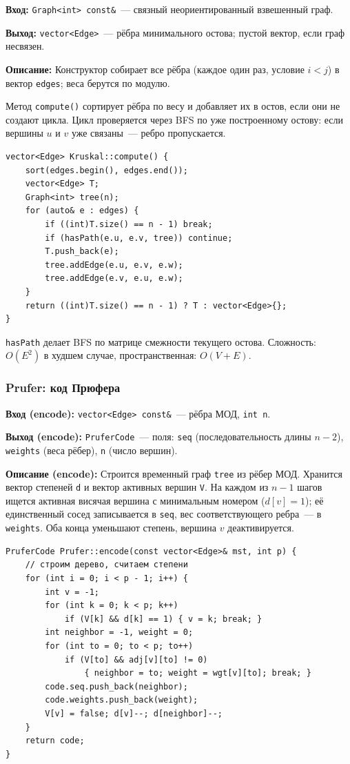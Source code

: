 \textbf{Вход:} \texttt{Graph<int> const\&}~--- связный неориентированный взвешенный граф.

\textbf{Выход:} \texttt{vector<Edge>}~--- рёбра минимального остова;
пустой вектор, если граф несвязен.

\textbf{Описание:} Конструктор собирает все рёбра (каждое один раз,
условие $i < j$) в вектор \texttt{edges}; веса берутся по модулю.

Метод \texttt{compute()} сортирует рёбра по весу и добавляет их в остов,
если они не создают цикла. Цикл проверяется через BFS по уже построенному
остову: если вершины $u$ и $v$ уже связаны~--- ребро пропускается.

\begin{lstlisting}[style=cstyle, caption={Основной цикл алгоритма Краскала (kruskal.cpp)}]
vector<Edge> Kruskal::compute() {
    sort(edges.begin(), edges.end());
    vector<Edge> T;
    Graph<int> tree(n);
    for (auto& e : edges) {
        if ((int)T.size() == n - 1) break;
        if (hasPath(e.u, e.v, tree)) continue;
        T.push_back(e);
        tree.addEdge(e.u, e.v, e.w);
        tree.addEdge(e.v, e.u, e.w);
    }
    return ((int)T.size() == n - 1) ? T : vector<Edge>{};
}
\end{lstlisting}

\texttt{hasPath} делает BFS по матрице смежности текущего остова.
Сложность: $O(E^2)$ в худшем случае, пространственная: $O(V + E)$.

\subsubsection{Prufer: код Прюфера}

\textbf{Вход (encode):} \texttt{vector<Edge> const\&}~--- рёбра МОД, \texttt{int n}.

\textbf{Выход (encode):} \texttt{PruferCode}~--- поля:
\texttt{seq} (последовательность длины $n-2$), \texttt{weights} (веса рёбер),
\texttt{n} (число вершин).

\textbf{Описание (encode):} Строится временный граф \texttt{tree} из рёбер МОД.
Хранится вектор степеней \texttt{d} и вектор активных вершин \texttt{V}.
На каждом из $n - 1$ шагов ищется активная висячая вершина с минимальным
номером ($d[v] = 1$); её единственный сосед записывается в \texttt{seq},
вес соответствующего ребра~--- в \texttt{weights}.
Оба конца уменьшают степень, вершина $v$ деактивируется.

\begin{lstlisting}[style=cstyle, caption={Кодирование в код Прюфера с сохранением весов (prufer.cpp)}]
PruferCode Prufer::encode(const vector<Edge>& mst, int p) {
    // строим дерево, считаем степени
    for (int i = 0; i < p - 1; i++) {
        int v = -1;
        for (int k = 0; k < p; k++)
            if (V[k] && d[k] == 1) { v = k; break; }
        int neighbor = -1, weight = 0;
        for (int to = 0; to < p; to++)
            if (V[to] && adj[v][to] != 0)
                { neighbor = to; weight = wgt[v][to]; break; }
        code.seq.push_back(neighbor);
        code.weights.push_back(weight);
        V[v] = false; d[v]--; d[neighbor]--;
    }
    return code;
}
\end{lstlisting}

